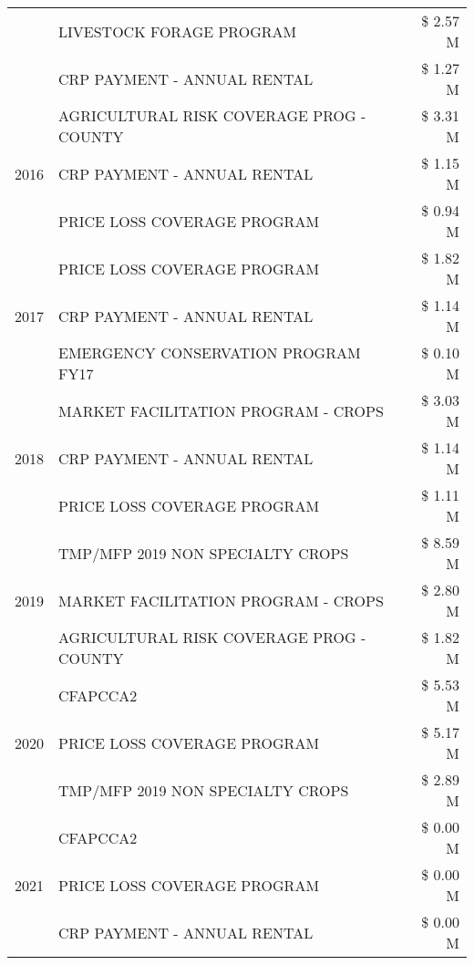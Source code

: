 \begin{tabular}{llr}
 & LIVESTOCK FORAGE PROGRAM & \$ 2.57 M \\
 & CRP PAYMENT - ANNUAL RENTAL & \$ 1.27 M \\
\cline{1-3}
\multirow[t]{3}{*}{2016} & AGRICULTURAL RISK COVERAGE PROG - COUNTY & \$ 3.31 M \\
 & CRP PAYMENT - ANNUAL RENTAL & \$ 1.15 M \\
 & PRICE LOSS COVERAGE PROGRAM & \$ 0.94 M \\
\cline{1-3}
\multirow[t]{3}{*}{2017} & PRICE LOSS COVERAGE PROGRAM & \$ 1.82 M \\
 & CRP PAYMENT - ANNUAL RENTAL & \$ 1.14 M \\
 & EMERGENCY CONSERVATION PROGRAM FY17 & \$ 0.10 M \\
\cline{1-3}
\multirow[t]{3}{*}{2018} & MARKET FACILITATION PROGRAM - CROPS & \$ 3.03 M \\
 & CRP PAYMENT - ANNUAL RENTAL & \$ 1.14 M \\
 & PRICE LOSS COVERAGE PROGRAM & \$ 1.11 M \\
\cline{1-3}
\multirow[t]{3}{*}{2019} & TMP/MFP 2019 NON SPECIALTY CROPS & \$ 8.59 M \\
 & MARKET FACILITATION PROGRAM - CROPS & \$ 2.80 M \\
 & AGRICULTURAL RISK COVERAGE PROG - COUNTY & \$ 1.82 M \\
\cline{1-3}
\multirow[t]{3}{*}{2020} & CFAPCCA2 & \$ 5.53 M \\
 & PRICE LOSS COVERAGE PROGRAM & \$ 5.17 M \\
 & TMP/MFP 2019 NON SPECIALTY CROPS & \$ 2.89 M \\
\cline{1-3}
\multirow[t]{3}{*}{2021} & CFAPCCA2 & \$ 0.00 M \\
 & PRICE LOSS COVERAGE PROGRAM & \$ 0.00 M \\
 & CRP PAYMENT - ANNUAL RENTAL & \$ 0.00 M \\
\cline{1-3}
\bottomrule
\end{tabular}
